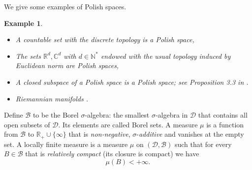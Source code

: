 \documentclass[twoside,11pt]{book}
\newtheorem{example}{Example}
\numberwithin{theorem}{chapter}
\numberwithin{definition}{chapter}
\numberwithin{proposition}{chapter}
\numberwithin{corollary}{chapter}
\numberwithin{example}{chapter}
\numberwithin{lemma}{chapter}
\numberwithin{assumption}{chapter}
\begin{document}
We give some examples of Polish spaces. 
\begin{example}\leavevmode\newline
\begin{itemize}
\item A countable set with the discrete topology is a Polish space, 
\item The sets $\mathbb{R}^{d}, \mathbb{C}^{d}$ with $d \in \mathbb{N}^{*}$ endowed with the usual topology induced by Euclidean norm are Polish spaces,
\item A closed subspace of a Polish space is a Polish space; see Proposition 3.3 in \citep{Kec95}.
\item Riemannian manifolds .

\end{itemize}
\end{example}

Define $\mathcal{B}$ to be the Borel $\sigma$-algebra: the smallest $\sigma$-algebra in $\mathcal{D}$ that contains all open subsets of $\mathcal{D}$. Its elements are called Borel sets. A measure $\mu$ is a function from $\mathcal{B}$ to $\mathbb{R}_{+} \cup \{\infty \}$ that is \emph{non-negative}, $\sigma$-\emph{additive} and vanishes at the empty set. A locally finite measure is a measure $\mu$ on $(\mathcal{D},\mathcal{B})$ such that for every  $B \in \mathcal{B}$ that is \emph{relatively compact} (its closure is compact) we have
\begin{equation}
\mu(B) <+\infty.
\end{equation}
\end{document}
